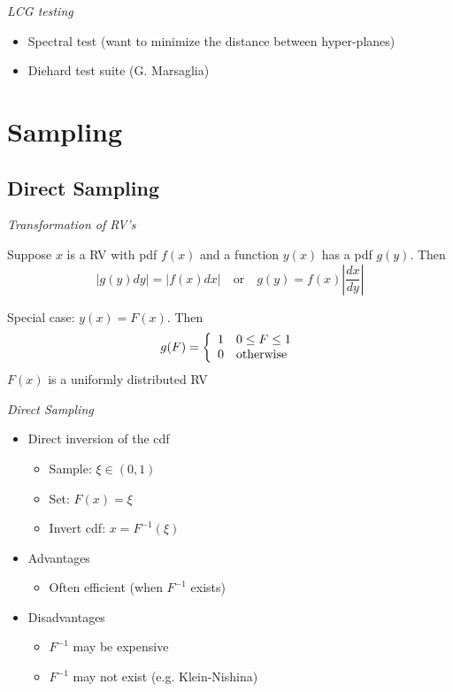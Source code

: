 \emph{LCG testing}
  \begin{itemize}
    \item Spectral test (want to minimize the distance between hyper-planes)
    \item Diehard test suite (G. Marsaglia)  
  \end{itemize}


\section{Sampling}

\subsection{Direct Sampling}

\emph{Transformation of RV's}
 
Suppose $x$ is a RV with pdf $f(x)$ and a function $y(x)$
has a pdf $g(y)$.  Then
\begin{equation*}
  |g(y)dy| = |f(x)dx| \quad \text{or} \quad  g(y) = f(x) \left | \frac{dx}{dy} \right |
\end{equation*}

\vfill
\textcolor{mitred}{Special case: $y(x) = F(x)$}.  Then 
\begin{equation*}
 g(F) =  \left \{ 
         \begin{array}{l l}
           1      & 0 \leq F \leq 1 \\
           0      & \text{otherwise} \\
  \end{array} \right . 
\end{equation*}
\vfill
 $F(x)$ is a uniformly distributed RV


\emph{Direct Sampling}

  \begin{itemize}
     \item Direct inversion of the cdf
     \begin{itemize}
      \item Sample: $\xi \in (0, 1)$
      \item Set: $F(x)=\xi$
      \item Invert cdf: $x=F^{-1}(\xi)$
     \end{itemize}

     \item Advantages
        \begin{itemize}
           \item Often efficient (when $F^{-1}$ exists)
        \end{itemize}

     \item Disadvantages
        \begin{itemize}
           \item $F^{-1}$ may be expensive
           \item $F^{-1}$ may not exist (e.g. Klein-Nishina)
        \end{itemize}
  \end{itemize}



